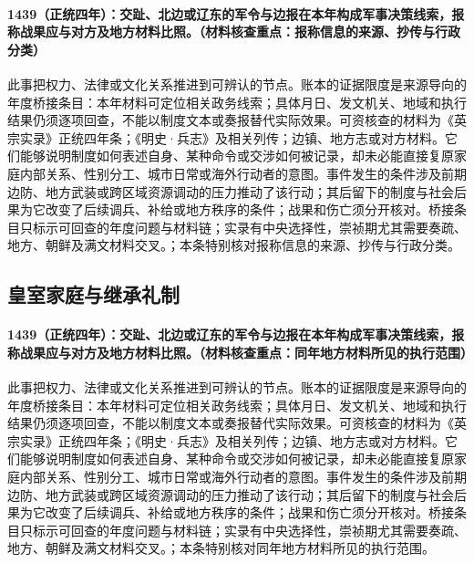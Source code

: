 \paragraph{1439（正统四年）：交趾、北边或辽东的军令与边报在本年构成军事决策线索，报称战果应与对方及地方材料比照。（材料核查重点：报称信息的来源、抄传与行政分类）} 此事把权力、法律或文化关系推进到可辨认的节点。账本的证据限度是来源导向的年度桥接条目：本年材料可定位相关政务线索；具体月日、发文机关、地域和执行结果仍须逐项回查，不能以制度文本或奏报替代实际效果。可资核查的材料为《英宗实录》正统四年条；《明史·兵志》及相关列传；边镇、地方志或对方材料。它们能够说明制度如何表述自身、某种命令或交涉如何被记录，却未必能直接复原家庭内部关系、性别分工、城市日常或海外行动者的意图。事件发生的条件涉及前期边防、地方武装或跨区域资源调动的压力推动了该行动；其后留下的制度与社会后果为它改变了后续调兵、补给或地方秩序的条件；战果和伤亡须分开核对。桥接条目只标示可回查的年度问题与材料链；实录有中央选择性，崇祯期尤其需要奏疏、地方、朝鲜及满文材料交叉。；本条特别核对报称信息的来源、抄传与行政分类。

\subsection{皇室家庭与继承礼制}

\paragraph{1439（正统四年）：交趾、北边或辽东的军令与边报在本年构成军事决策线索，报称战果应与对方及地方材料比照。（材料核查重点：同年地方材料所见的执行范围）} 此事把权力、法律或文化关系推进到可辨认的节点。账本的证据限度是来源导向的年度桥接条目：本年材料可定位相关政务线索；具体月日、发文机关、地域和执行结果仍须逐项回查，不能以制度文本或奏报替代实际效果。可资核查的材料为《英宗实录》正统四年条；《明史·兵志》及相关列传；边镇、地方志或对方材料。它们能够说明制度如何表述自身、某种命令或交涉如何被记录，却未必能直接复原家庭内部关系、性别分工、城市日常或海外行动者的意图。事件发生的条件涉及前期边防、地方武装或跨区域资源调动的压力推动了该行动；其后留下的制度与社会后果为它改变了后续调兵、补给或地方秩序的条件；战果和伤亡须分开核对。桥接条目只标示可回查的年度问题与材料链；实录有中央选择性，崇祯期尤其需要奏疏、地方、朝鲜及满文材料交叉。；本条特别核对同年地方材料所见的执行范围。

